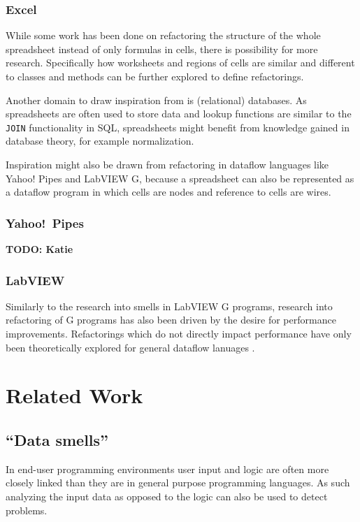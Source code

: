 \documentclass[10pt,conference,compsocconf]{IEEEtran}
\newcommand{\todo}[1]{\textbf{TODO: #1}}
\begin{document}
\subsubsection{Excel}

While some work has been done on refactoring the structure of the whole spreadsheet instead of only formulas in cells, there is possibility for more research. 
Specifically how worksheets and regions of cells are similar and different to classes and methods can be further explored to define refactorings.

Another domain to draw inspiration from is (relational) databases.
As spreadsheets are often used to store data and lookup functions are similar to the \texttt{JOIN} functionality in SQL, spreadsheets might benefit from knowledge gained in database theory, for example normalization.

Inspiration might also be drawn from refactoring in dataflow languages like Yahoo! Pipes and LabVIEW G, because a spreadsheet can also be represented as a dataflow program in which cells are nodes and reference to cells are wires.

\subsubsection{Yahoo!\ Pipes}
\todo{Katie}

\subsubsection{LabVIEW}

Similarly to the research into smells in LabVIEW G programs, research into refactoring of G programs has also been driven by the desire for performance improvements. Refactorings which do not directly impact performance have only been theoretically explored for general dataflow lanuages \cite{sui2008automated}.

\section{Related Work}
\label{sec:related_work}

\subsection{``Data smells''}
\label{subsec:related_datasmells}

In end-user programming environments user input and logic are often more closely linked than they are in general purpose programming languages.
As such analyzing the input data as opposed to the logic can also be used to detect problems.
\end{document}
